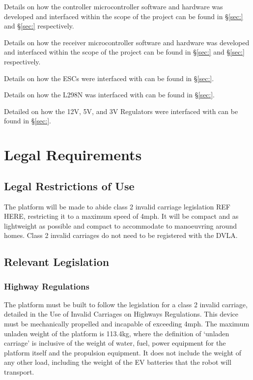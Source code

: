 \documentclass [12pt]{article}
\begin{document}
{\parindent0pt

Details on how the controller microcontroller software and hardware was developed and interfaced within the scope of the project can be found in  §\ref{sec:} and §\ref{sec:} respectively.

Details on how the receiver microcontroller software and hardware was developed and interfaced within the scope of the project can be found in  §\ref{sec:} and §\ref{sec:} respectively.

Details on how the ESCs were interfaced with can be found in §\ref{sec:}.

Details on how the L298N was interfaced with can be found in §\ref{sec:}.

Detailed on how the 12V, 5V, and 3V Regulators were interfaced with can be found in §\ref{sec:}.

}

\section{Legal Requirements}
\subsection{Legal Restrictions of Use}
The platform will be made to abide class 2 invalid carriage legislation REF HERE, restricting it to a maximum speed of 4mph. It will be compact and as lightweight as possible and compact to accommodate to manoeuvring around homes. Class 2 invalid carriages do not need to be registered with the DVLA.

\subsection{Relevant Legislation}
\subsubsection{Highway Regulations}
The platform must be built to follow the legislation for a class 2 invalid carriage, detailed in the Use of Invalid Carriages \cite{Invalid_Legislation} on Highways Regulations. This device must be mechanically propelled and incapable of exceeding 4mph. The maximum unladen weight of the platform is 113.4kg, where the definition of ‘unladen carriage’ is inclusive of the weight of water, fuel, power equipment for the platform itself and the propulsion equipment. It does not include the weight of any other load, including the weight of the EV batteries that the robot will transport. 
\end{document}

